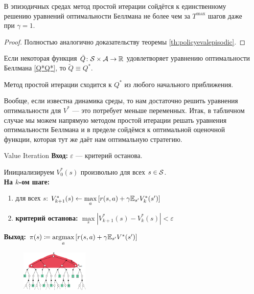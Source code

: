 \begin{theorem}
В эпизодичных средах метод простой итерации сойдётся к единственному решению уравнений оптимальности Беллмана не более чем за $T^{\max}$ шагов даже при $\gamma = 1$.
\begin{proof} Полностью аналогично доказательству теоремы \ref{th:policyevalepisodic}.
\end{proof}
\end{theorem}

\begin{proposition}
Если некоторая функция $\tilde{Q} \colon \mathcal{S} \times \mathcal{A} \to \mathbb{R}$ удовлетворяет уравнению оптимальности Беллмана \eqref{Q*Q*}, то $\tilde{Q} \equiv Q^*$.
\end{proposition}

\begin{proposition}
Метод простой итерации сходится к $Q^*$ из любого начального приближения.
\end{proposition}

Вообще, если известна динамика среды, то нам достаточно решить уравнения оптимальности для $V^*$ --- это потребует меньше переменных. Итак, в табличном случае мы можем напрямую методом простой итерации решать уравнения оптимальности Беллмана и в пределе сойдёмся к оптимальной оценочной функции, которая тут же даёт нам оптимальную стратегию.

\begin{algorithm}[label=valueiteration]{Value Iteration}
\textbf{Вход:} $\varepsilon$ --- критерий останова.

\vspace{0.3cm}
Инициализируем $V^*_0(s)$ произвольно для всех $s \in \mathcal{S}$. \\
\textbf{На $k$-ом шаге:}
\begin{enumerate}
    \item для всех $s$: $V^*_{k+1}(s) \leftarrow \max\limits_a \left[ r(s, a) + \gamma \mathbb{E}_{s'} V^*_k(s')\right]$
    \item \textbf{критерий останова:} $\max\limits_{s} | V^*_{k+1}(s) - V^*_k(s) | < \varepsilon$
\end{enumerate}

\vspace{0.3cm}
\textbf{Выход:} $\pi(s) \coloneqq \mathop{\mathrm{argmax}}\limits_a \left[ r(s, a) + \gamma \mathbb{E}_{s'} V^*(s')\right]$
\end{algorithm}

\begin{figure}
\centering
\includegraphics[width=0.3\textwidth]{Images/DP_backup.png}
\end{figure}

